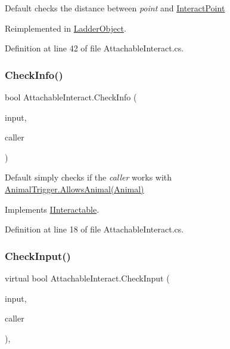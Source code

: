 Default checks the distance between {\itshape point}  and \mbox{\hyperlink{class_attachable_interact_ad46e0ca3808d58ab5e1102e379d6cb7e}{Interact\+Point}} 



Reimplemented in \mbox{\hyperlink{class_ladder_object_a9199b2da6f97c758e595a4ccdf7c98b0}{Ladder\+Object}}.



Definition at line 42 of file Attachable\+Interact.\+cs.

\mbox{\label{class_attachable_interact_a8426a9821130ecde5ed75517ca2ee5d7}} 
\subsubsection{\texorpdfstring{Check\+Info()}{CheckInfo()}}
{\footnotesize\ttfamily bool Attachable\+Interact.\+Check\+Info (\begin{DoxyParamCaption}\item[{Input\+Control}]{input,  }\item[{\mbox{\hyperlink{class_animal}{Animal}}}]{caller }\end{DoxyParamCaption})}



Default simply checks if the {\itshape caller}  works with \mbox{\hyperlink{class_animal_trigger_ae8394dfcf5f91b8c413959a4d6baa3a9}{Animal\+Trigger.\+Allows\+Animal(\+Animal)}} 



Implements \mbox{\hyperlink{interface_i_interactable_a5142ebbddd5d91a93da436941ad77d8e}{I\+Interactable}}.



Definition at line 18 of file Attachable\+Interact.\+cs.

\mbox{\label{class_attachable_interact_a7efc3c845dc5112e6c744eee254094e6}} 
\subsubsection{\texorpdfstring{Check\+Input()}{CheckInput()}}
{\footnotesize\ttfamily virtual bool Attachable\+Interact.\+Check\+Input (\begin{DoxyParamCaption}\item[{Input\+Control}]{input,  }\item[{\mbox{\hyperlink{class_animal}{Animal}}}]{caller }\end{DoxyParamCaption})\hspace{0.3cm}{\ttfamily [protected]}, {\ttfamily [virtual]}}



